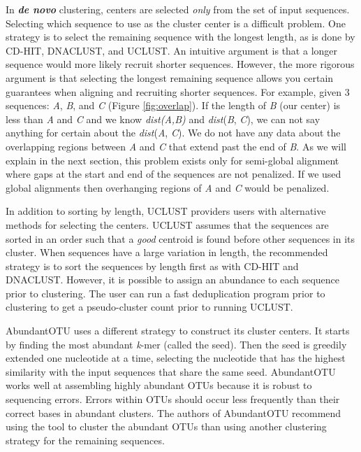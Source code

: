 In {\bf \emph{de novo}} clustering, centers are selected \emph{only} from the set of input sequences.
Selecting which sequence to use as the cluster center is a difficult problem.
One strategy is to select the remaining sequence with the longest length, as is done by CD-HIT\cite{li_clustering_2001}, DNACLUST\cite{ghodsi_dnaclust:_2011}, and UCLUST\cite{edgar_search_2010}.
An intuitive argument is that a longer sequence would more likely recruit shorter sequences.
However, the more rigorous argument is that selecting the longest remaining sequence allows you certain guarantees when aligning and recruiting shorter sequences.
For example, given 3 sequences: \emph{A}, \emph{B}, and \emph{C} (Figure \ref{fig:overlap}).  If the length of \emph{B} (our center) is less than \emph{A} and \emph{C} and we know \emph{dist(\emph{A},\emph{B})} and \emph{dist}(\emph{B}, \emph{C}), we can not say anything for certain about the \emph{dist}(\emph{A}, \emph{C}).
We do not have any data about the overlapping regions between \emph{A} and \emph{C} that extend past the end of \emph{B}.
As we will explain in the next section, this problem exists only for semi-global alignment where gaps at the start and end of the sequences are not penalized.  If we used global alignments then overhanging regions of \emph{A} and \emph{C} would be penalized.

In addition to sorting by length, UCLUST providers users with alternative methods for selecting the centers.
UCLUST assumes that the sequences are sorted in an order such that a \emph{good} centroid is found before other sequences in its cluster.
When sequences have a large variation in length, the recommended strategy is to sort the sequences by length first as with CD-HIT and DNACLUST.
However, it is possible to assign an abundance to each sequence prior to clustering.
The user can run a fast deduplication program prior to clustering to get a pseudo-cluster count prior to running UCLUST.

AbundantOTU\cite{ye_identification_2010} uses a different strategy to construct its cluster centers.
It starts by finding the most abundant \emph{k}-mer (called the seed).
Then the seed is greedily extended one nucleotide at a time, selecting the nucleotide that has the highest similarity with the input sequences that share the same seed.
AbundantOTU works well at assembling highly abundant OTUs because it is robust to sequencing errors.
Errors within OTUs should occur less frequently than their correct bases in abundant clusters.
The authors of AbundantOTU recommend using the tool to cluster the abundant OTUs than using another clustering strategy for the remaining sequences.

